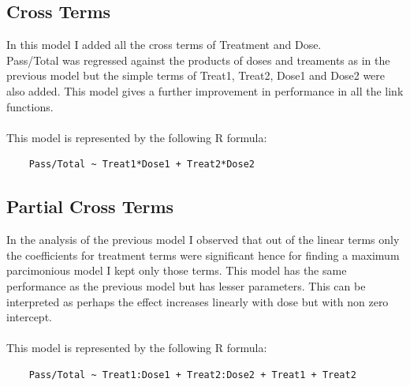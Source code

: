 \documentclass{article}
\begin{document}
\subsection{Cross Terms}
In this model I added all the cross terms of Treatment and Dose.\\
Pass/Total was regressed against the products of doses and treaments as in the 
previous model but the simple terms of Treat1, Treat2, Dose1 and Dose2 were also added.
This model gives a further improvement in performance in all the link functions.\\
\\
This model is represented by the following R formula:\\
\begin{verbatim}
    Pass/Total ~ Treat1*Dose1 + Treat2*Dose2
\end{verbatim}

\subsection{Partial Cross Terms}
In the analysis of the previous model I observed that out
of the linear terms only the coefficients for treatment terms were significant
hence for finding a maximum parcimonious model I kept only those terms.
This model has the same performance as the previous model but has lesser parameters.
This can be interpreted as perhaps the effect increases linearly with dose but with non zero intercept.\\
\\
This model is represented by the following R formula:\\
\begin{verbatim}
    Pass/Total ~ Treat1:Dose1 + Treat2:Dose2 + Treat1 + Treat2
\end{verbatim}
\end{document}
